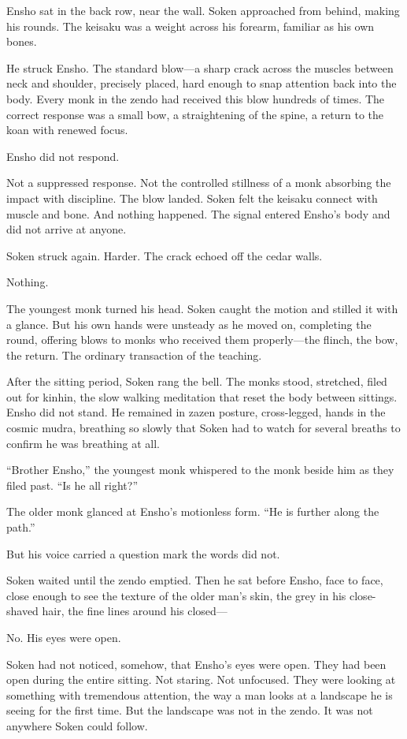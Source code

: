 Ensho sat in the back row, near the wall. Soken approached from behind, making his rounds. The keisaku was a weight across his forearm, familiar as his own bones.

He struck Ensho. The standard blow---a sharp crack across the muscles between neck and shoulder, precisely placed, hard enough to snap attention back into the body. Every monk in the zendo had received this blow hundreds of times. The correct response was a small bow, a straightening of the spine, a return to the koan with renewed focus.

Ensho did not respond.

Not a suppressed response. Not the controlled stillness of a monk absorbing the impact with discipline. The blow landed. Soken felt the keisaku connect with muscle and bone. And nothing happened. The signal entered Ensho's body and did not arrive at anyone.

Soken struck again. Harder. The crack echoed off the cedar walls.

Nothing.

The youngest monk turned his head. Soken caught the motion and stilled it with a glance. But his own hands were unsteady as he moved on, completing the round, offering blows to monks who received them properly---the flinch, the bow, the return. The ordinary transaction of the teaching.

After the sitting period, Soken rang the bell. The monks stood, stretched, filed out for kinhin, the slow walking meditation that reset the body between sittings. Ensho did not stand. He remained in zazen posture, cross-legged, hands in the cosmic mudra, breathing so slowly that Soken had to watch for several breaths to confirm he was breathing at all.

``Brother Ensho,'' the youngest monk whispered to the monk beside him as they filed past. ``Is he all right?''

The older monk glanced at Ensho's motionless form. ``He is further along the path.''

But his voice carried a question mark the words did not.

Soken waited until the zendo emptied. Then he sat before Ensho, face to face, close enough to see the texture of the older man's skin, the grey in his close-shaved hair, the fine lines around his closed---

No. His eyes were open.

Soken had not noticed, somehow, that Ensho's eyes were open. They had been open during the entire sitting. Not staring. Not unfocused. They were looking at something with tremendous attention, the way a man looks at a landscape he is seeing for the first time. But the landscape was not in the zendo. It was not anywhere Soken could follow.


